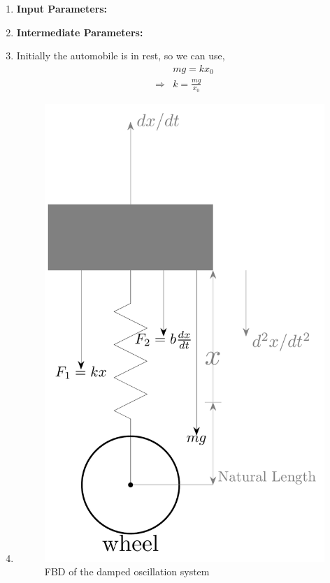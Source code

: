 \documentclass[journal,12pt,twocolumn]{IEEEtran}
\theoremstyle{remark}
\begin{document}
\begin{enumerate}
\item \textbf{Input Parameters:}
\begin{table}[h]
    
\end{table}
\item \textbf{Intermediate Parameters:}
\begin{table}[h]

\end{table}

\item{}
    Initially the automobile is in rest, so we can use,
    \begin{align}
&mg = kx_0 \\
\Rightarrow &k=\frac{mg}{x_0}
    \end{align}

\item{}
\begin{figure}[h]
        \centering
        \includegraphics[width=0.8\linewidth]{11_14_21_fbd.pdf}
        \caption{FBD of the damped oscillation system}
        \label{fig:enter-label}
    \end{figure}


\end{enumerate}
\end{document}

